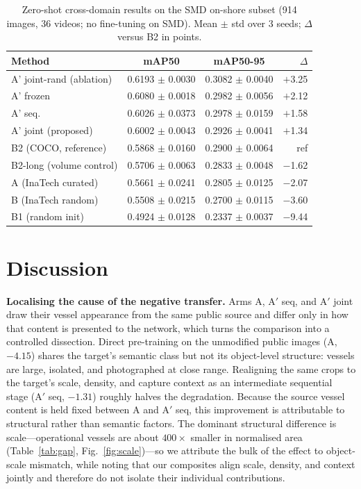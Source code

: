 \documentclass[10pt,conference]{IEEEtran}
\begin{document}
\begin{table}[t]
\caption{Zero-shot cross-domain results on the SMD on-shore subset (914 images, 36 videos; no fine-tuning on SMD). Mean $\pm$ std over 3 seeds; $\Delta$ versus B2 in points.}
\label{tab:smd_results}
\centering
\begin{tabular}{lccr}
\toprule
Method & mAP50 & mAP50-95 & $\Delta$ \\
\midrule
A' joint-rand (ablation)  & 0.6193 $\pm$ 0.0030 & 0.3082 $\pm$ 0.0040 & $+$3.25 \\
A' frozen                 & 0.6080 $\pm$ 0.0018 & 0.2982 $\pm$ 0.0056 & $+$2.12 \\
A' seq.                   & 0.6026 $\pm$ 0.0373 & 0.2978 $\pm$ 0.0159 & $+$1.58 \\
A' joint (proposed)       & 0.6002 $\pm$ 0.0043 & 0.2926 $\pm$ 0.0041 & $+$1.34 \\
B2 (COCO, reference)      & 0.5868 $\pm$ 0.0160 & 0.2900 $\pm$ 0.0064 & ref \\
B2-long (volume control)  & 0.5706 $\pm$ 0.0063 & 0.2833 $\pm$ 0.0048 & $-$1.62 \\
A (InaTech curated)       & 0.5661 $\pm$ 0.0241 & 0.2805 $\pm$ 0.0125 & $-$2.07 \\
B (InaTech random)        & 0.5508 $\pm$ 0.0215 & 0.2700 $\pm$ 0.0115 & $-$3.60 \\
B1 (random init)          & 0.4924 $\pm$ 0.0128 & 0.2337 $\pm$ 0.0037 & $-$9.44 \\
\bottomrule
\end{tabular}
\end{table}

\section{Discussion}
\textbf{Localising the cause of the negative transfer.} Arms A, A$'$ seq, and
A$'$ joint draw their vessel appearance from the same public source and differ
only in how that content is presented to the network, which turns the comparison
into a controlled dissection. Direct pre-training on the unmodified public images
(A, $-4.15$) shares the target's semantic class but not its object-level
structure: vessels are large, isolated, and photographed at close range.
Realigning the same crops to the target's scale, density, and capture context as
an intermediate sequential stage (A$'$ seq, $-1.31$) roughly halves the
degradation. Because the source vessel content is held fixed between A and
A$'$ seq, this improvement is attributable to structural rather than semantic
factors. The dominant structural difference is scale---operational vessels are
about $400\times$ smaller in normalised area (Table~\ref{tab:gap},
Fig.~\ref{fig:scale})---so we attribute the bulk of the effect to object-scale
mismatch, while noting that our composites align scale, density, and context
jointly and therefore do not isolate their individual contributions.
\end{document}
